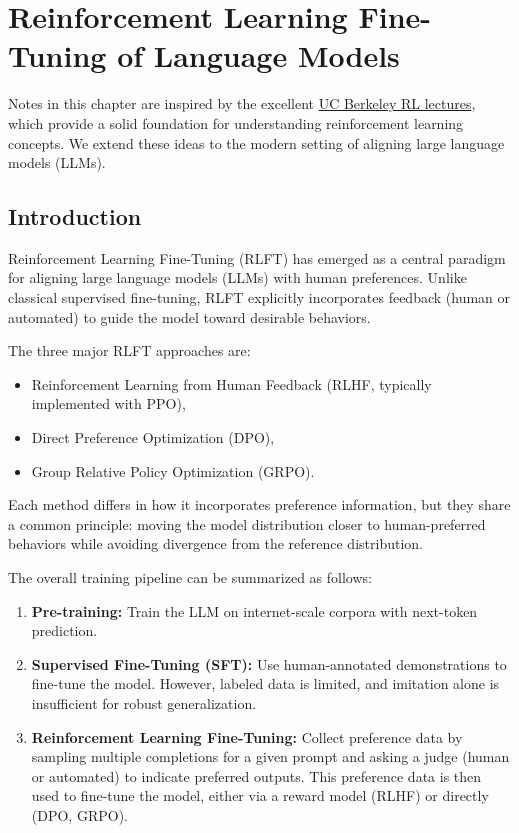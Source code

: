 \chapter{Reinforcement Learning Fine-Tuning of Language Models}
\label{chap:rlft}

Notes in this chapter are inspired by the excellent \href{https://youtu.be/BqZC7mDSbIg?feature=shared}{UC Berkeley RL lectures}, which provide a solid foundation for understanding reinforcement learning concepts. We extend these ideas to the modern setting of aligning large language models (LLMs).

\section{Introduction}
Reinforcement Learning Fine-Tuning (RLFT) has emerged as a central paradigm for aligning large language models (LLMs) with human preferences. Unlike classical supervised fine-tuning, RLFT explicitly incorporates feedback (human or automated) to guide the model toward desirable behaviors.  

The three major RLFT approaches are:
\begin{itemize}
    \item Reinforcement Learning from Human Feedback (RLHF, typically implemented with PPO),
    \item Direct Preference Optimization (DPO),
    \item Group Relative Policy Optimization (GRPO).
\end{itemize}

Each method differs in how it incorporates preference information, but they share a common principle: moving the model distribution closer to human-preferred behaviors while avoiding divergence from the reference distribution.

The overall training pipeline can be summarized as follows:
\begin{enumerate}
    \item \textbf{Pre-training:} Train the LLM on internet-scale corpora with next-token prediction.
    \item \textbf{Supervised Fine-Tuning (SFT):} Use human-annotated demonstrations to fine-tune the model. However, labeled data is limited, and imitation alone is insufficient for robust generalization.
    \item \textbf{Reinforcement Learning Fine-Tuning:} Collect preference data by sampling multiple completions for a given prompt and asking a judge (human or automated) to indicate preferred outputs. This preference data is then used to fine-tune the model, either via a reward model (RLHF) or directly (DPO, GRPO).
\end{enumerate}

